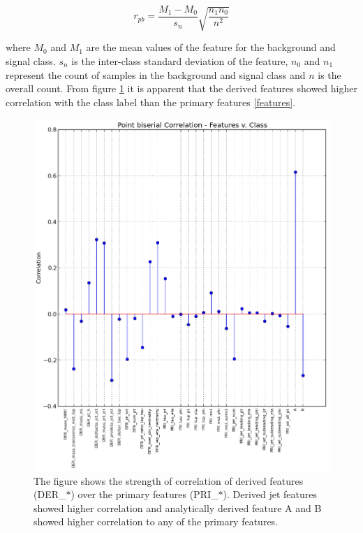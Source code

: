 \documentclass[final,3p,times,twocolumn]{elsarticle}
\begin{document}
\begin{equation}
r_{pb} = \dfrac{M_{1} - M_{0}}{s_{n}}\sqrt{\dfrac{n_{1}n_{0}}{n^2}}
\end{equation}

where $M_{0}$ and $M_{1}$ are the mean values of the feature for the background and signal class. $s_{n}$ is the inter-class standard deviation of the feature, $n_{0}$ and $n_{1}$ represent the count of samples in the background and signal class and $n$ is the overall count. From figure \ref{biserial} it is apparent that the derived features showed higher correlation with the class label than the primary features \ref{features}. 
 
\begin{figure}
\hspace{1.8cm}
\includegraphics[scale=0.6]{Images/BiSerialCorr.png}
\caption{The figure shows the strength of correlation of derived features (DER\_$*$) over the primary features (PRI\_$*$). Derived jet features showed higher correlation and analytically derived feature A and B showed higher correlation to any of the primary features.}
\label{biserial}
\end{figure}
\end{document}
